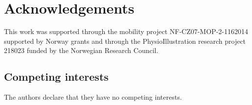 \documentclass[twocolumn]{bmcart}%
\begin{document}
\section*{Acknowledgements}
This work was supported through the mobility project NF-CZ07-MOP-2-1162014 supported by Norway grants and through the PhysioIllustration research project 218023 funded by the Norwegian Research Council.

\begin{backmatter}


\section*{Competing interests}
The authors declare that they have no competing interests.





\end{backmatter}
\end{document}

